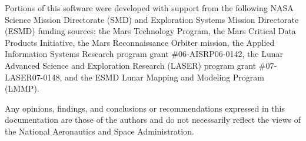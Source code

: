 Portions of this software were developed with support from the
following NASA Science Mission Directorate (SMD) and Exploration
Systems Mission Directorate (ESMD) funding sources: the Mars
Technology Program, the Mars Critical Data Products Initiative, the
Mars Reconnaissance Orbiter mission, the Applied Information Systems
Research program grant \#06-AISRP06-0142, the Lunar Advanced Science
and Exploration Research (LASER) program grant \#07-LASER07-0148,
and the ESMD Lunar Mapping and Modeling Program (LMMP).

Any opinions, findings, and conclusions or recommendations expressed
in this documentation are those of the authors and do not necessarily
reflect the views of the National Aeronautics and Space Administration.

